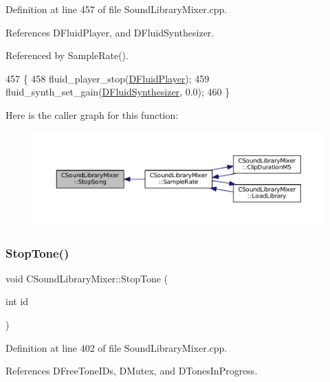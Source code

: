 Definition at line 457 of file Sound\+Library\+Mixer.\+cpp.



References D\+Fluid\+Player, and D\+Fluid\+Synthesizer.



Referenced by Sample\+Rate().


\begin{DoxyCode}
457                                  \{
458     fluid\_player\_stop(\hyperlink{classCSoundLibraryMixer_a6773ddf83ef86bc27598f6c5cee61d9c}{DFluidPlayer});
459     fluid\_synth\_set\_gain(\hyperlink{classCSoundLibraryMixer_a6c1663c381dbf2aa18c82a23141f409c}{DFluidSynthesizer}, 0.0);
460 \}
\end{DoxyCode}
Here is the caller graph for this function\+:\nopagebreak
\begin{figure}[H]
\begin{center}
\leavevmode
\includegraphics[width=350pt]{classCSoundLibraryMixer_a13fdebfbc5fdee60067c38a3c60dd2a9_icgraph}
\end{center}
\end{figure}
\hypertarget{classCSoundLibraryMixer_ab57bc3217de14130ed95c48223351ce3}{}\label{classCSoundLibraryMixer_ab57bc3217de14130ed95c48223351ce3} 
\subsubsection{\texorpdfstring{Stop\+Tone()}{StopTone()}}
{\footnotesize\ttfamily void C\+Sound\+Library\+Mixer\+::\+Stop\+Tone (\begin{DoxyParamCaption}\item[{int}]{id }\end{DoxyParamCaption})}



Definition at line 402 of file Sound\+Library\+Mixer.\+cpp.



References D\+Free\+Tone\+I\+Ds, D\+Mutex, and D\+Tones\+In\+Progress.




